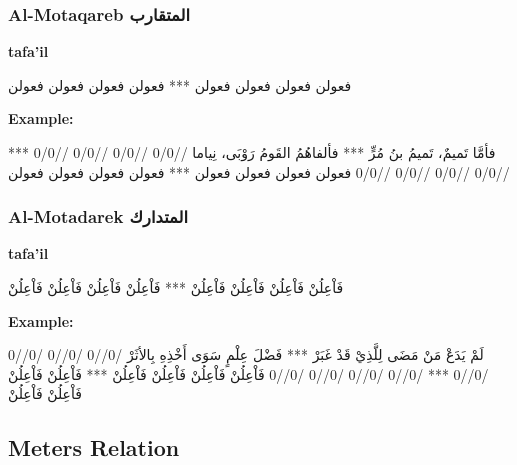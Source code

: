 \subsubsection{Al-Motaqareb \textarabic{المتقارب}}
\textbf{tafa'il}
\begin{Arabic}
\begin{traditionalpoem*}
    فعولن فعولن فعولن فعولن *** فعولن فعولن فعولن فعولن
\end{traditionalpoem*}
\end{Arabic}
\textbf{Example:}
\begin{Arabic}
\begin{traditionalpoem*}
فأمَّا تَميمٌ، تَميمُ بنُ مُرٍّ *** فألفاهُمُ القَومُ رَوْبَى، نِياما
    //0/0 //0/0 //0/0 //0/0 *** //0/0 //0/0 //0/0 //0/0
    فعولن فعولن فعولن فعولن *** فعولن فعولن فعولن فعولن
\end{traditionalpoem*}
\end{Arabic}
\subsubsection{Al-Motadarek \textarabic{المتدارك}}
\textbf{tafa'il}
\begin{Arabic}
\begin{traditionalpoem*}
فَاْعِلُنْ فَاْعِلُنْ فَاْعِلُنْ فَاْعِلُنْ *** فَاْعِلُنْ فَاْعِلُنْ فَاْعِلُنْ فَاْعِلُنْ
\end{traditionalpoem*}
\end{Arabic}
\textbf{Example:}
\begin{Arabic}
\begin{traditionalpoem*}
    لَمْ يَدَعْ مَنْ مَضَى لِلَّذِيْ قَدْ غَبَرْ *** فَضْلَ عِلْمٍ سَوَى أَخْذِهِ بِالأثَرْ
    /0//0 /0//0 /0//0 /0//0 *** /0//0 /0//0 /0//0 /0//0
    فَاْعِلُنْ فَاْعِلُنْ فَاْعِلُنْ فَاْعِلُنْ *** فَاْعِلُنْ فَاْعِلُنْ فَاْعِلُنْ فَاْعِلُنْ
 \end{traditionalpoem*}
\end{Arabic}
  \newpage
  \subsection{Meters Relation}

